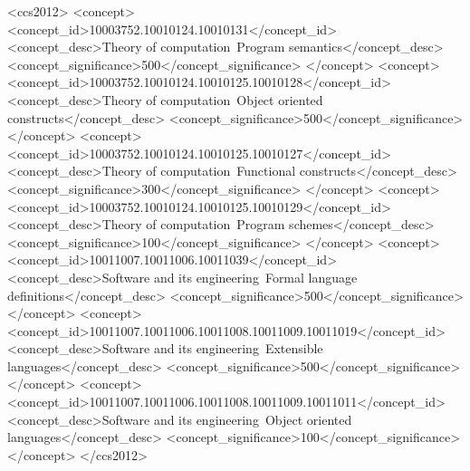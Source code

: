 \begin{CCSXML}
  <ccs2012>
  <concept>
  <concept_id>10003752.10010124.10010131</concept_id>
  <concept_desc>Theory of computation~Program semantics</concept_desc>
  <concept_significance>500</concept_significance>
  </concept>
  <concept>
  <concept_id>10003752.10010124.10010125.10010128</concept_id>
  <concept_desc>Theory of computation~Object oriented constructs</concept_desc>
  <concept_significance>500</concept_significance>
  </concept>
  <concept>
  <concept_id>10003752.10010124.10010125.10010127</concept_id>
  <concept_desc>Theory of computation~Functional constructs</concept_desc>
  <concept_significance>300</concept_significance>
  </concept>
  <concept>
  <concept_id>10003752.10010124.10010125.10010129</concept_id>
  <concept_desc>Theory of computation~Program schemes</concept_desc>
  <concept_significance>100</concept_significance>
  </concept>
  <concept>
  <concept_id>10011007.10011006.10011039</concept_id>
  <concept_desc>Software and its engineering~Formal language definitions</concept_desc>
  <concept_significance>500</concept_significance>
  </concept>
  <concept>
  <concept_id>10011007.10011006.10011008.10011009.10011019</concept_id>
  <concept_desc>Software and its engineering~Extensible languages</concept_desc>
  <concept_significance>500</concept_significance>
  </concept>
  <concept>
  <concept_id>10011007.10011006.10011008.10011009.10011011</concept_id>
  <concept_desc>Software and its engineering~Object oriented languages</concept_desc>
  <concept_significance>100</concept_significance>
  </concept>
  </ccs2012>
\end{CCSXML}


\fi %

\maketitle

